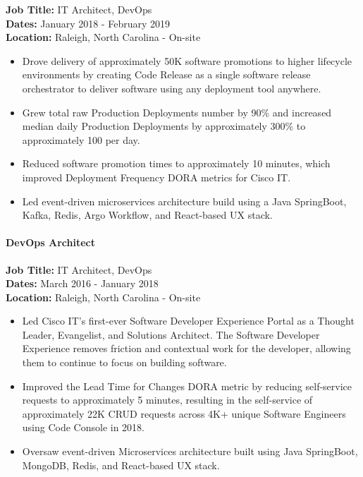\documentclass[
]{article}
\providecommand{\tightlist}{%
  \setlength{\itemsep}{0pt}\setlength{\parskip}{0pt}}
\renewcommand{\tightlist}{%
  \setlength{\itemsep}{0.12em}\setlength{\parskip}{0pt}\setlength{\parsep}{0pt}%
}
\begin{document}
\textbf{Job Title:} IT Architect, DevOps\\
\textbf{Dates:} January 2018 - February 2019\\
\textbf{Location:} Raleigh, North Carolina - On-site

\begin{itemize}
\tightlist
\item
  Drove delivery of approximately 50K software promotions to higher
  lifecycle environments by creating Code Release as a single software
  release orchestrator to deliver software using any deployment tool
  anywhere.
\item
  Grew total raw Production Deployments number by 90\% and increased
  median daily Production Deployments by approximately 300\% to
  approximately 100 per day.
\item
  Reduced software promotion times to approximately 10 minutes, which
  improved Deployment Frequency DORA metrics for Cisco IT.
\item
  Led event-driven microservices architecture build using a Java
  SpringBoot, Kafka, Redis, Argo Workflow, and React-based UX stack.
\end{itemize}

\paragraph{DevOps Architect}\label{devops-architect-1}

\textbf{Job Title:} IT Architect, DevOps\\
\textbf{Dates:} March 2016 - January 2018\\
\textbf{Location:} Raleigh, North Carolina - On-site

\begin{itemize}
\tightlist
\item
  Led Cisco IT's first-ever Software Developer Experience Portal as a
  Thought Leader, Evangelist, and Solutions Architect. The Software
  Developer Experience removes friction and contextual work for the
  developer, allowing them to continue to focus on building software.
\item
  Improved the Lead Time for Changes DORA metric by reducing
  self-service requests to approximately 5 minutes, resulting in the
  self-service of approximately 22K CRUD requests across 4K+ unique
  Software Engineers using Code Console in 2018.
\item
  Oversaw event-driven Microservices architecture built using Java
  SpringBoot, MongoDB, Redis, and React-based UX stack.
\end{itemize}
\end{document}
